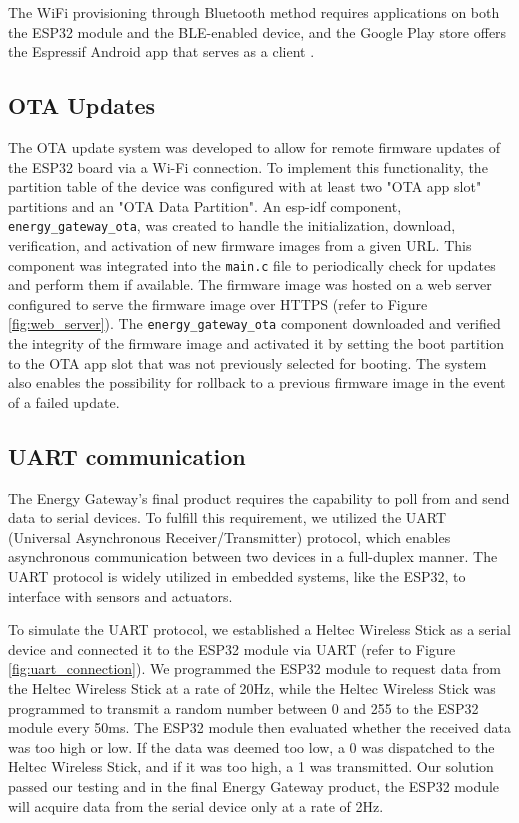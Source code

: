 The WiFi provisioning through Bluetooth method requires applications on both the ESP32 module and the BLE-enabled device, and the Google Play store offers the Espressif Android app that serves as a client \cite{google-play:esp-ble-provisioning}.

\subsection{OTA Updates}

The OTA update system was developed to allow for remote firmware updates of the ESP32 board via a Wi-Fi connection. To implement this functionality, the partition table of the device was configured with at least two "OTA app slot" partitions and an "OTA Data Partition". An esp-idf component, \texttt{energy\_gateway\_ota}, was created to handle the initialization, download, verification, and activation of new firmware images from a given URL. This component was integrated into the \texttt{main.c} file to periodically check for updates and perform them if available. The firmware image was hosted on a web server configured to serve the firmware image over HTTPS (refer to Figure \ref{fig:web_server}). The \texttt{energy\_gateway\_ota} component downloaded and verified the integrity of the firmware image and activated it by setting the boot partition to the OTA app slot that was not previously selected for booting. The system also enables the possibility for rollback to a previous firmware image in the event of a failed update.

\subsection{UART communication}

The Energy Gateway's final product requires the capability to poll from and send data to serial devices. To fulfill this requirement, we utilized the UART (Universal Asynchronous Receiver/Transmitter) protocol, which enables asynchronous communication between two devices in a full-duplex manner. The UART protocol is widely utilized in embedded systems, like the ESP32, to interface with sensors and actuators.

To simulate the UART protocol, we established a Heltec Wireless Stick as a serial device and connected it to the ESP32 module via UART (refer to Figure \ref{fig:uart_connection}). We programmed the ESP32 module to request data from the Heltec Wireless Stick at a rate of 20Hz, while the Heltec Wireless Stick was programmed to transmit a random number between 0 and 255 to the ESP32 module every 50ms. The ESP32 module then evaluated whether the received data was too high or low. If the data was deemed too low, a 0 was dispatched to the Heltec Wireless Stick, and if it was too high, a 1 was transmitted. Our solution passed our testing and in the final Energy Gateway product, the ESP32 module will acquire data from the serial device only at a rate of 2Hz.

